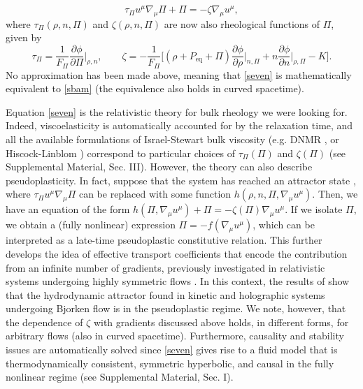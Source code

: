 \documentclass[aps,prl,noshowpacs,noshowkeys,floatfix,superscriptaddress,singlecolum,nofootinbib]{revtex4-2}
\theoremstyle{definition}
\theoremstyle{theorem}
\begin{document}
\begin{equation}
\tau_\Pi u^\mu \nabla_\mu \Pi +\Pi = -\zeta \nabla_\mu u^\mu ,
\label{seven}
\end{equation}
where $\tau_\Pi(\rho,n,\Pi)$ and $\zeta(\rho,n,\Pi)$ are now also rheological functions of $\Pi$, given by
\begin{equation}\label{dictionary}
\tau_\Pi = \dfrac{1}{F_\Pi} \dfrac{\partial \phi}{\partial \Pi}\bigg|_{\rho,n} , \qquad
\zeta = -\dfrac{1}{F_\Pi} \bigg[ (\rho{+}P_{\text{eq}}{+}\Pi)\dfrac{\partial \phi}{\partial \rho}\bigg|_{n,\Pi} \! \! \! +n \dfrac{\partial \phi}{\partial n}\bigg|_{\rho,\Pi} - K  \bigg]. 
\end{equation}
No approximation has been made above, meaning that  \eqref{seven} is mathematically equivalent to \eqref{sbam} (the equivalence also holds in curved spacetime).

Equation \eqref{seven} is the relativistic theory for bulk rheology we were looking for. Indeed, viscoelasticity is automatically accounted for by the relaxation time, and all the available formulations of Israel-Stewart bulk viscosity (e.g. DNMR \cite{Denicol2012Boltzmann}, or Hiscock-Linblom \cite{Hiscock_Lindblom_stability_1983}) correspond to particular choices of $\tau_\Pi(\Pi)$ and $\zeta(\Pi)$ (see Supplemental Material, Sec. III). However, the theory can also describe pseudoplasticity. In fact, suppose that the system has reached an attractor state \cite{Heller:2015dha}, where $\tau_\Pi u^\mu \nabla_\mu \Pi$ can be replaced with some function $h(\rho,n,\Pi,\nabla_\mu u^\mu)$. Then, we have an equation of the form $h(\Pi,\nabla_\mu u^\mu)+\Pi=-\zeta(\Pi)\nabla_\mu u^\mu$. If we isolate $\Pi$, we obtain a (fully nonlinear) expression $\Pi=-f(\nabla_\mu u^\mu)$, which can be interpreted as a late-time pseudoplastic constitutive relation. This further develops the idea of effective transport coefficients that encode the contribution from an infinite number of gradients, previously investigated in relativistic systems undergoing highly symmetric flows  \cite{Romatschke:2017vte,Denicol:2017lxn,Blaizot:2017ucy,Behtash:2018moe,Denicol:2020eij}. In this context, the results of \cite{Romatschke:2017vte} show that the hydrodynamic attractor found in kinetic and holographic systems undergoing Bjorken flow is in the pseudoplastic regime. We note, however, that the dependence of $\zeta$ with gradients discussed above holds, in different forms, for arbitrary flows (also in curved spacetime). Furthermore, causality and stability issues are automatically solved since \eqref{seven} gives rise to a fluid model that is thermodynamically consistent, symmetric hyperbolic, and causal in the fully nonlinear regime (see Supplemental Material, Sec. I).\\
\end{document}
